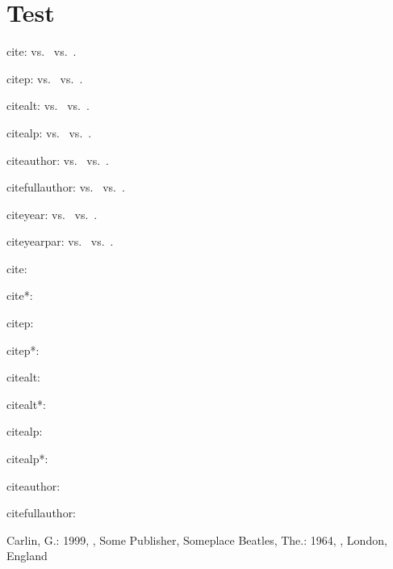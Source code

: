 \documentclass{article}
\begin{document}

\section{Test}

cite: \cite{Car1999} vs.~\cite[A]{Car1999} vs.~\cite[A][B]{Car1999}.

citep: \citep{Car1999} vs.~\citep[A]{Car1999} vs.~\citep[A][B]{Car1999}.

citealt: \citealt{Car1999} vs.~\citealt[A]{Car1999} vs.~\citealt[A][B]{Car1999}.

citealp: \citealp{Car1999} vs.~\citealp[A]{Car1999} vs.~\citealp[A][B]{Car1999}.


citeauthor: \citeauthor{Car1999} vs.~\citeauthor[A]{Car1999} vs.~\citeauthor[A][B]{Car1999}.

citefullauthor:  vs.~ vs.~.

citeyear: \citeyear{Car1999} vs.~\citeyear[A]{Car1999} vs.~\citeyear[A][B]{Car1999}.

citeyearpar: \citeyearpar{Car1999} vs.~\citeyearpar[A]{Car1999} vs.~\citeyearpar[A][B]{Car1999}.

cite: \cite{Beat1964}

cite*: \cite*{Beat1964}

citep: \citep{Beat1964}

citep*: \citep*{Beat1964}

citealt: \citealt{Beat1964}

citealt*: \citealt*{Beat1964}

citealp: \citealp{Beat1964}

citealp*: \citealp*{Beat1964}

citeauthor: \citeauthor{Beat1964}

citefullauthor: 

\begin{thebibliography}{}
Carlin, G.: 1999,
,
\newblock Some Publisher, Someplace
Beatles, The.: 1964,
,
\newblock London, England
\end{thebibliography}
\end{document}
